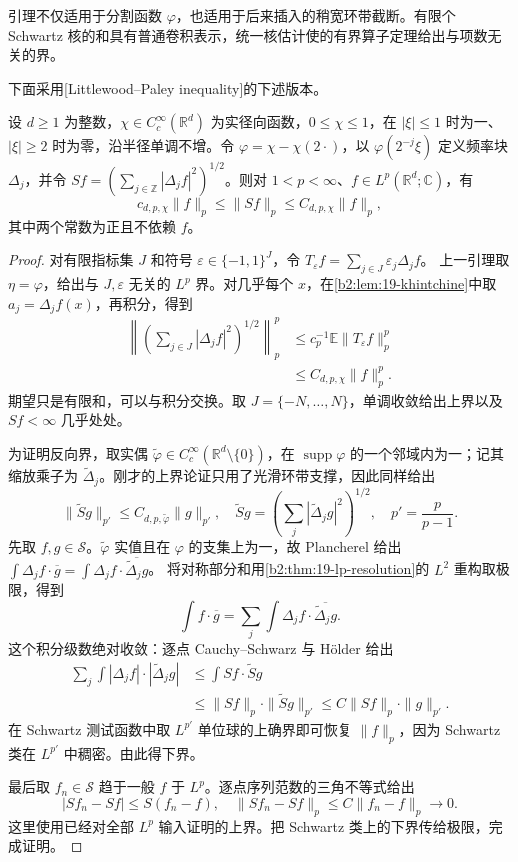 引理不仅适用于分割函数 \(\varphi\)，也适用于后来插入的稍宽环带截断。有限个 Schwartz 核的和具有普通卷积表示，统一核估计使的有界算子定理给出与项数无关的界。

下面采用[Littlewood--Paley inequality]的下述版本。
\begin{theorem}\label{b2:thm:19-square-function}
设 \(d\geq1\) 为整数，\(\chi\in C_c^\infty(\mathbb R^d)\) 为实径向函数，\(0\leq\chi\leq1\)，在 \(|\xi|\leq1\) 时为一、\(|\xi|\geq2\) 时为零，沿半径单调不增。令 \(\varphi=\chi-\chi(2\cdot)\)，以 \(\varphi(2^{-j}\xi)\) 定义频率块 \(\Delta_j\)，并令 \(Sf=(\sum_{j\in\mathbb Z}|\Delta_jf|^2)^{1/2}\)。则对 \(1<p<\infty\)、\(f\in L^p(\mathbb R^d;\mathbb C)\)，有
\[
 c_{d,p,\chi}\|f\|_p\leq\|Sf\|_p
 \leq C_{d,p,\chi}\|f\|_p,
\]
其中两个常数为正且不依赖 \(f\)。
\end{theorem}
\begin{proof}
对有限指标集 \(J\) 和符号 \(\varepsilon\in\{-1,1\}^J\)，令
\(T_\varepsilon f=\sum_{j\in J}\varepsilon_j\Delta_jf\)。
上一引理取 \(\eta=\varphi\)，给出与 \(J,\varepsilon\) 无关的 \(L^p\) 界。对几乎每个 \(x\)，在\cref{b2:lem:19-khintchine}中取 \(a_j=\Delta_jf(x)\)，再积分，得到
\[
 \begin{aligned}
 \left\|\left(\sum_{j\in J}|\Delta_jf|^2\right)^{1/2}\right\|_p^p
 &\leq c_p^{-1}\mathbb E\|T_\varepsilon f\|_p^p\\
 &\leq C_{d,p,\chi}\|f\|_p^p.
 \end{aligned}
\]
期望只是有限和，可以与积分交换。取 \(J=\{-N,\ldots,N\}\)，单调收敛给出上界以及 \(Sf<\infty\) 几乎处处。

为证明反向界，取实偶 \(\widetilde\varphi\in C_c^\infty(\mathbb R^d\setminus\{0\})\)，在 \(\operatorname{supp}\varphi\) 的一个邻域内为一；记其缩放乘子为 \(\widetilde\Delta_j\)。刚才的上界论证只用了光滑环带支撑，因此同样给出
\[
 \|\widetilde Sg\|_{p'}\leq C_{d,p,\widetilde\varphi}\|g\|_{p'},
 \quad
 \widetilde Sg=\left(\sum_j|\widetilde\Delta_jg|^2\right)^{1/2},
 \quad p'=\frac p{p-1}.
\]
先取 \(f,g\in\mathcal S\)。\(\widetilde\varphi\) 实值且在 \(\varphi\) 的支集上为一，故 Plancherel 给出
\(\int\Delta_jf\cdot\overline g=\int\Delta_jf\cdot\overline{\widetilde\Delta_jg}\)。
将对称部分和用\cref{b2:thm:19-lp-resolution}的 \(L^2\) 重构取极限，得到
\[
 \int f\cdot\overline g
 =\sum_j\int\Delta_jf\cdot\overline{\widetilde\Delta_jg}.
\]
这个积分级数绝对收敛：逐点 Cauchy--Schwarz 与 Hölder 给出
\[
 \begin{aligned}
 \sum_j\int|\Delta_jf|\cdot|\widetilde\Delta_jg|
 &\leq\int Sf\cdot\widetilde Sg\\
 &\leq\|Sf\|_p\cdot\|\widetilde Sg\|_{p'}
 \leq C\|Sf\|_p\cdot\|g\|_{p'}.
 \end{aligned}
\]
在 Schwartz 测试函数中取 \(L^{p'}\) 单位球的上确界即可恢复 \(\|f\|_p\)，因为 Schwartz 类在 \(L^{p'}\) 中稠密。由此得下界。

最后取 \(f_n\in\mathcal S\) 趋于一般 \(f\) 于 \(L^p\)。逐点序列范数的三角不等式给出
\[
 |Sf_n-Sf|\leq S(f_n-f),
 \quad
 \|Sf_n-Sf\|_p\leq C\|f_n-f\|_p\longrightarrow0.
\]
这里使用已经对全部 \(L^p\) 输入证明的上界。把 Schwartz 类上的下界传给极限，完成证明。
\end{proof}

